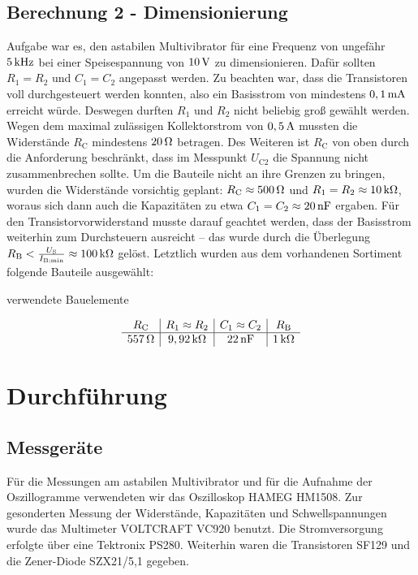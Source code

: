 \documentclass[numbers=noenddot,10pt,a4paper]{scrartcl}
\newcommand{\indx}[1]{_\text{#1}}
\begin{document}
\subsection{Berechnung 2 - Dimensionierung}
Aufgabe war es, den astabilen Multivibrator für eine Frequenz von ungefähr $\unit[5]{kHz}$ bei einer Speisespannung von $\unit[10]{V}$ zu dimensionieren. Dafür sollten $R_1=R_2$ und $C_1=C_2$ angepasst werden. Zu beachten war, dass die Transistoren voll durchgesteuert werden konnten, also ein Basisstrom von mindestens $\unit[0,1]{mA}$ erreicht würde. Deswegen durften $R_1$ und $R_2$ nicht beliebig groß gewählt werden. Wegen dem maximal zulässigen Kollektorstrom von $\unit[0,5]{A}$ mussten die Widerstände $R\indx{C}$ mindestens $\unit[20]{\Omega}$ betragen. Des Weiteren ist $R\indx{C}$ von oben durch die Anforderung beschränkt, dass im Messpunkt $U\indx{C2}$ die Spannung nicht zusammenbrechen sollte. Um die Bauteile nicht an ihre Grenzen zu bringen, wurden die Widerstände vorsichtig geplant: $R\indx{C}\approx\unit[500]{\Omega}$ und $R_1=R_2\approx\unit[10]{k\Omega}$, woraus sich dann auch die Kapazitäten zu etwa $C_1=C_2\approx\unit[20]{nF}$ ergaben. Für den Transistorvorwiderstand musste darauf geachtet werden, dass der Basisstrom weiterhin zum Durchsteuern ausreicht -- das wurde durch die Überlegung $R\indx{B}<\frac{U\indx{S}}{I\indx{B;min}}\approx\unit[100]{k\Omega}$ gelöst. Letztlich wurden aus dem vorhandenen Sortiment folgende Bauteile ausgewählt:
\begin{table}[H]
\caption{verwendete Bauelemente}
\vspace{-1em}
\begin{align*}
\begin{array}{c|c|c|c}
 R\indx{C} & R_1\approx R_2 & C_1\approx C_2 & R\indx{B} \\ 
\hline \unit[557]{\Omega} & \unit[9,92]{k\Omega} & \unit[22]{nF} & \unit[1]{k\Omega}
\end{array} 
\end{align*}
\end{table}
\section{Durchführung}
\subsection{Messgeräte}
Für die Messungen am astabilen Multivibrator und für die Aufnahme der Oszillogramme verwendeten wir das Oszilloskop HAMEG HM1508. Zur gesonderten Messung der Widerstände, Kapazitäten und Schwellspannungen wurde das Multimeter VOLTCRAFT VC920 benutzt. Die Stromversorgung erfolgte über eine Tektronix PS280. Weiterhin waren die Transistoren SF129 und die Zener-Diode SZX21/5,1 gegeben.
\end{document}
